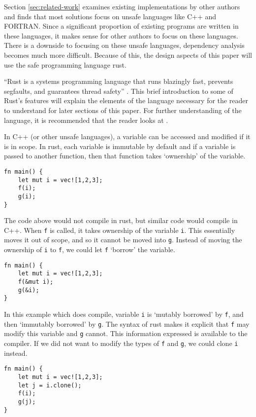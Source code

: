 \documentclass[conference]{IEEEtran}
\begin{document}
Section \ref{sec:related-work} examines existing implementations by other authors and finds that most solutions focus on unsafe languages like C++ and FORTRAN. Since a significant proportion of existing programs are written in these languages, it makes sense for other authors to focus on these languages.  There is a downside to focusing on these unsafe languages, dependency analysis becomes much more difficult. Because of this, the design aspects of this paper will use the safe programming language rust.

``Rust is a systems programming language that runs blazingly fast, prevents segfaults, and guarantees thread safety'' \parencite{rustlang}. This brief introduction to some of Rust's features will explain the elements of the language necessary for the reader to understand for later sections of this paper. For further understanding of the language, it is recommended that the reader looks at \textcite{rustbook}.

In C++ (or other unsafe languages), a variable can be accessed and modified if it is in scope. In rust, each variable is immutable by default and if a variable is passed to another function, then that function takes `ownership' of the variable.

\begin{verbatim}
fn main() {
    let mut i = vec![1,2,3];
    f(i);
    g(i);
}
\end{verbatim}

The code above would not compile in rust, but similar code would compile in C++. When \texttt{f} is called, it takes ownership of the variable \texttt{i}. This essentially moves it out of scope, and so it cannot be moved into \texttt{g}. Instead of moving the ownership of \texttt{i} to \texttt{f}, we could let \texttt{f} `borrow' the variable.

\begin{verbatim}
fn main() {
    let mut i = vec![1,2,3];
    f(&mut i);
    g(&i);
}
\end{verbatim}

In this example which does compile, variable \texttt{i} is `mutably borrowed' by \texttt{f}, and then `immutably borrowed' by \texttt{g}. The syntax of rust makes it explicit that \texttt{f} may modify this variable and \texttt{g} cannot. This information expressed is available to the compiler. If we did not want to modify the types of \texttt{f} and \texttt{g}, we could clone \texttt{i} instead.

\begin{verbatim}
fn main() {
    let mut i = vec![1,2,3];
    let j = i.clone();
    f(i);
    g(j);
}
\end{verbatim}
\end{document}
